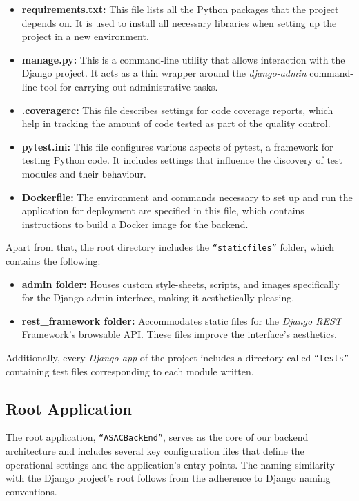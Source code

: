 \begin{itemize}
    \item \textbf{requirements.txt:} This file lists all the Python packages that the project depends on. It is used to install all necessary libraries when setting up the project in a new environment.
    \item \textbf{manage.py:} This is a command-line utility that allows interaction with the Django project. It acts as a thin wrapper around the \textit{django-admin} command-line tool for carrying out administrative tasks.
    \item \textbf{.coveragerc:} This file describes settings for code coverage reports, which help in tracking the amount of code tested as part of the quality control. 
    \item \textbf{pytest.ini:} This file configures various aspects of pytest, a framework for testing Python code. It includes settings that influence the discovery of test modules and their behaviour.
    \item \textbf{Dockerfile:} The environment and commands necessary to set up and run the application for deployment are specified in this file, which contains instructions to build a Docker image for the backend.
\end{itemize}

Apart from that, the root directory includes the \texttt{``staticfiles''} folder, which contains the following:

\begin{itemize}
    \item \textbf{admin folder:} Houses custom style-sheets, scripts, and images specifically for the Django admin interface, making it aesthetically pleasing.
    \item \textbf{rest\_framework folder:} Accommodates static files for the \textit{Django REST} Framework's browsable API. These files improve the interface's aesthetics.
\end{itemize}

Additionally, every \textit{Django app} of the project includes a directory called \texttt{``tests''} containing test files corresponding to each module written.

\subsection{Root Application}

The root application, \texttt{``ASACBackEnd''}, serves as the core of our backend architecture and includes several key configuration files that define the operational settings and the application's entry points. The naming similarity with the Django project's root follows from the adherence to Django naming conventions.

